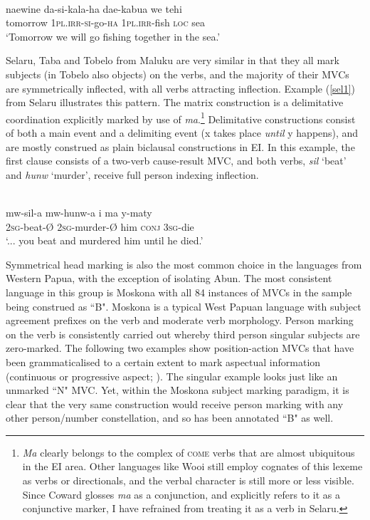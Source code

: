 \ea 
{}\\
\gll naewine da-si-kala-ha dae-kabua we tehi \\
tomorrow 1\textsc{pl}.\textsc{irr}-\textsc{si}-go-\textsc{ha} 1\textsc{pl}.\textsc{irr}-fish \textsc{loc} sea \\
\glft `Tomorrow we will go fishing together in the sea.' \\ 
\z

Selaru, Taba and Tobelo from Maluku are very similar in that they all mark subjects (in Tobelo also objects) on the verbs, and the majority of their MVCs are symmetrically inflected, with all verbs attracting inflection. Example (\ref{sel1}) from Selaru illustrates this pattern. The matrix construction is a delimitative coordination explicitly marked by use of \textit{ma}.\footnote{\textit{Ma} clearly belongs to the complex of \textsc{come} verbs that are almost ubiquitous in the EI area. Other languages like Wooi still employ cognates of this lexeme as verbs or directionals, and the verbal character is still more or less visible. Since Coward glosses \textit{ma} as a conjunction, and explicitly refers to it as a conjunctive marker, I have refrained from treating it as a verb in Selaru.} Delimitative constructions consist of both a main event and a delimiting event (x takes place \textit{until} y happens), and are mostly construed as plain biclausal constructions in EI. In this example, the first clause consists of a two-verb cause-result MVC, and both verbs, \textit{sil} `beat' and \textit{hunw} `murder', receive full person indexing inflection.

\ea \label{sel1}
\\
\gll mw-sil-a mw-hunw-a i ma y-maty \\
2\textsc{sg}-beat-Ø 2\textsc{sg}-murder-Ø him \textsc{conj} 3\textsc{sg}-die \\
\glft `... you beat and murdered him until he died.'\\ 
\z

Symmetrical head marking is also the most common choice in the languages from Western Papua, with the exception of isolating Abun. The most consistent language in this group is Moskona with all 84 instances of MVCs in the sample being construed as ``B". Moskona is a typical West Papuan language with subject agreement prefixes on the verb and moderate verb morphology. Person marking on the verb is consistently carried out whereby third person singular subjects are zero-marked. The following two examples show position-action MVCs that have been grammaticalised to a certain extent to mark aspectual information (continuous or progressive aspect; \citealt[296]{gravelle2010grammar}). The singular example looks just like an unmarked ``N" MVC. Yet, within the Moskona subject marking paradigm, it is clear that the very same construction would receive person marking with any other person/number constellation, and so has been annotated ``B" as well.

